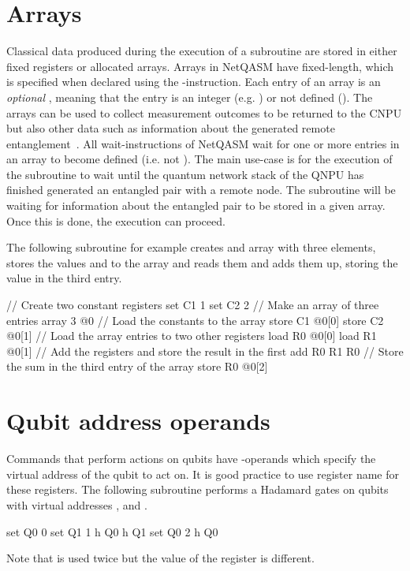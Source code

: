 \section{Arrays}
Classical data produced during the execution of a subroutine are stored in either fixed registers or allocated arrays.
Arrays in \ac{NetQASM} have fixed-length, which is specified when declared using the -instruction.
Each entry of an array is an \emph{optional} \IMMEDIATE, meaning that the entry is an integer (e.g. ) or not defined ().
The arrays can be used to collect measurement outcomes to be returned to the \ac{CNPU} but also other data such as information about the generated remote entanglement~\cite{dahlberg2019linklayer,kozlowski2020networklayer}.
All wait-instructions of \ac{NetQASM} wait for one or more entries in an array to become defined (i.e. not ).
The main use-case is for the execution of the subroutine to wait until the quantum network stack of the \ac{QNPU} has finished generated an entangled pair with a remote node.
The subroutine will be waiting for information about the entangled pair to be stored in a given array.
Once this is done, the execution can proceed.

The following subroutine for example creates and array with three elements, stores the values  and  to the array and reads them and adds them up, storing the value in the third entry.
\begin{nqcode}
// Create two constant registers
set C1 1
set C2 2
// Make an array of three entries
array 3 @0
// Load the constants to the array
store C1 @0[0]
store C2 @0[1]
// Load the array entries to two other registers
load R0 @0[0]
load R1 @0[1]
// Add the registers and store the result in the first
add R0 R1 R0
// Store the sum in the third entry of the array
store R0 @0[2]\end{nqcode}

\section{Qubit address operands}
Commands that perform actions on qubits have \REGISTER-operands which specify the virtual address of the qubit to act on.
It is good practice to use register name  for these registers.
The following subroutine performs a Hadamard gates on qubits with virtual addresses ,  and .
\begin{nqcode}
set Q0 0
set Q1 1
h Q0
h Q1
set Q0 2
h Q0\end{nqcode}
Note that  is used twice but the value of the register is different.

